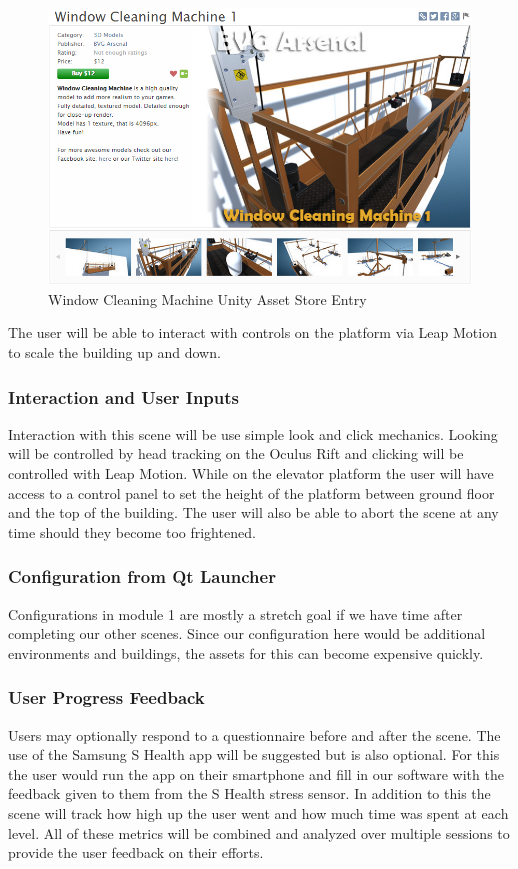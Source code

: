 \documentclass[a4paper,10pt]{article}
\begin{document}
\begin{figure}[H] %
	\centerline {\includegraphics[scale = 0.50]{elevator.png}}
	\caption{Window Cleaning Machine Unity Asset Store Entry}
	\label{fig:elevator}
\end{figure}
The user will be able to interact with controls on the platform via Leap Motion to scale the building up and down.
\subsubsection{Interaction and User Inputs}
Interaction with this scene will be use simple look and click mechanics. Looking will be controlled by head tracking on the Oculus Rift and clicking will be controlled with Leap Motion. While on the elevator platform the user will have access to a control panel to set the height of the platform between ground floor and the top of the building. The user will also be able to abort the scene at any time should they become too frightened. 

\subsubsection{Configuration from Qt Launcher}
Configurations in module 1 are mostly a stretch goal if we have time after completing our other scenes. Since our configuration here would be additional environments and buildings, the assets for this can become expensive quickly.

\subsubsection{User Progress Feedback}
Users may optionally respond to a questionnaire before and after the scene. The use of the Samsung S Health app will be suggested but is also optional. For this the user would run the app on their smartphone and fill in our software with the feedback given to them from the S Health stress sensor. In addition to this the scene will track how high up the user went and how much time was spent at each level. All of these metrics will be combined and analyzed over multiple sessions to provide the user feedback on their efforts.%
\end{document}
